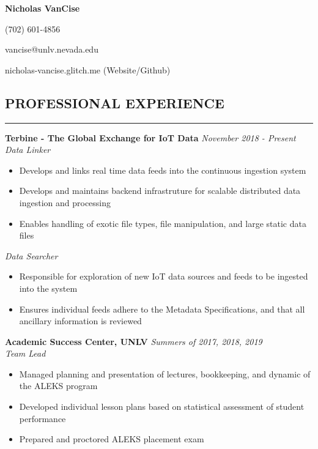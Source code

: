 \documentclass{res}
\begin{document}
	\thispagestyle{empty} %
	\centerline{\bf \Large{Nicholas VanCise}}
	\centerline{(702) 601-4856}
	\centerline{vancise@unlv.nevada.edu}
  \centerline{nicholas-vancise.glitch.me (Website/Github)}

	\begin{resume}

		\section{{PROFESSIONAL EXPERIENCE}}
    \noindent\rule[0.5ex]{\linewidth}{1pt}
		{\bf Terbine - The Global Exchange for IoT Data} \hfill \emph{November 2018 - Present} \\
			\emph{Data Linker}

			\begin{itemize} \itemsep -2pt
				\item Develops and links real time data feeds into the continuous ingestion system
				\item Develops and maintains backend infrastruture for scalable distributed data ingestion and processing
				\item Enables handling of exotic file types, file manipulation, and large static data files
			\end{itemize}

			\emph{Data Searcher}

			\begin{itemize} \itemsep -2pt
				\item Responsible for exploration of new IoT data sources and feeds to be ingested into the system
				\item Ensures individual feeds adhere to the Metadata Specifications, and that all ancillary information is reviewed
			\end{itemize}

		{\bf Academic Success Center, UNLV} \hfill \emph{Summers of 2017, 2018, 2019} \\
			\emph{Team Lead}

			\begin{itemize} \itemsep -2pt
				\item Managed planning and presentation of lectures, bookkeeping, and dynamic of the ALEKS program
				\item Developed individual lesson plans based on statistical assessment of student performance
        \item Prepared and proctored ALEKS placement exam
			\end{itemize}



\end{resume}
\end{document}

